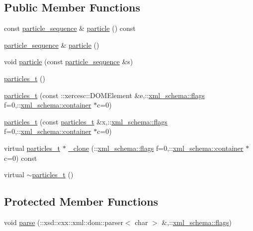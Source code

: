 \subsection*{Public Member Functions}
\begin{DoxyCompactItemize}
\item 
const \hyperlink{classparticles__t_a372e39e275f0ebfb91ac53eacdb4a1f2}{particle\-\_\-sequence} \& \hyperlink{classparticles__t_a009d0b10466f40908ac7c04372e4f23a}{particle} () const 
\item 
\hyperlink{classparticles__t_a372e39e275f0ebfb91ac53eacdb4a1f2}{particle\-\_\-sequence} \& \hyperlink{classparticles__t_a650f19bfd27cd9147cb2b0582082b1e8}{particle} ()
\item 
void \hyperlink{classparticles__t_a0cb8ecabf9a6f69ccd5fff1aed7df628}{particle} (const \hyperlink{classparticles__t_a372e39e275f0ebfb91ac53eacdb4a1f2}{particle\-\_\-sequence} \&s)
\item 
\hyperlink{classparticles__t_a9c7dcbcc9095cbb3af000a21428857e1}{particles\-\_\-t} ()
\item 
\hyperlink{classparticles__t_a9ef428228cfde19bce256f8a1f049218}{particles\-\_\-t} (const \-::xercesc\-::\-D\-O\-M\-Element \&e,\-::\hyperlink{namespacexml__schema_a0612287d030cb2732d31a45b258fdc87}{xml\-\_\-schema\-::flags} f=0,\-::\hyperlink{namespacexml__schema_ada9aa30dc722e93ee2ed7243085402a5}{xml\-\_\-schema\-::container} $\ast$c=0)
\item 
\hyperlink{classparticles__t_a514a3402a2a2b51545a1b40f1308e561}{particles\-\_\-t} (const \hyperlink{classparticles__t}{particles\-\_\-t} \&x,\-::\hyperlink{namespacexml__schema_a0612287d030cb2732d31a45b258fdc87}{xml\-\_\-schema\-::flags} f=0,\-::\hyperlink{namespacexml__schema_ada9aa30dc722e93ee2ed7243085402a5}{xml\-\_\-schema\-::container} $\ast$c=0)
\item 
virtual \hyperlink{classparticles__t}{particles\-\_\-t} $\ast$ \hyperlink{classparticles__t_a146af23d709a1d8ca6bf11b11a386850}{\-\_\-clone} (\-::\hyperlink{namespacexml__schema_a0612287d030cb2732d31a45b258fdc87}{xml\-\_\-schema\-::flags} f=0,\-::\hyperlink{namespacexml__schema_ada9aa30dc722e93ee2ed7243085402a5}{xml\-\_\-schema\-::container} $\ast$c=0) const 
\item 
virtual \hyperlink{classparticles__t_ab9b0649923ec8e2bf1cfa800560d39e4}{$\sim$particles\-\_\-t} ()
\end{DoxyCompactItemize}
\subsection*{Protected Member Functions}
\begin{DoxyCompactItemize}
\item 
void \hyperlink{classparticles__t_addce04b09439b1685fd5f09362484546}{parse} (\-::xsd\-::cxx\-::xml\-::dom\-::parser$<$ char $>$ \&,\-::\hyperlink{namespacexml__schema_a0612287d030cb2732d31a45b258fdc87}{xml\-\_\-schema\-::flags})
\end{DoxyCompactItemize}
